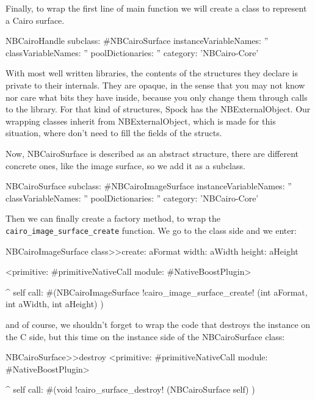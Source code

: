 \documentclass[a4paper,10pt,twoside]{book}
\begin{document}
Finally, to wrap the first line of main function we will create a
class to represent a Cairo surface.

\begin{classdef}{}
NBCairoHandle subclass: #NBCairoSurface
	instanceVariableNames: ''
	classVariableNames: ''
	poolDictionaries: ''
	category: 'NBCairo-Core'
\end{classdef}

With most well written libraries, the contents of the structures
they declare is private to their internals. They are opaque, in the
sense that you may not know nor care what bits they have inside,
because you only change them through calls to the library.
For that kind of structures, Spock has the NBExternalObject.
Our wrapping classes inherit from NBExternalObject, which is
made for this situation, where don't need to fill the fields
of the structs.

Now, NBCairoSurface is described as an abstract structure, 
there are different concrete ones, like the image surface,
so we add it as a subclass.


\begin{classdef}{}
NBCairoSurface subclass: #NBCairoImageSurface
	instanceVariableNames: ''
	classVariableNames: ''
	poolDictionaries: ''
	category: 'NBCairo-Core'
\end{classdef}

Then we can finally create a factory method, to wrap the \verb|cairo_image_surface_create| function. We go to the class side and
we enter:

\begin{code}{}
NBCairoImageSurface class>>create: aFormat width: aWidth height: aHeight

	<primitive: #primitiveNativeCall module: #NativeBoostPlugin>
	
	^ self call: #(NBCairoImageSurface !cairo\_image\_surface\_create! (int aFormat,
                                                         int aWidth,
                                                         int aHeight) )
\end{code}

and of course, we shouldn't forget to wrap the code that destroys the instance on the C side, but this time on the instance side of the NBCairoSurface class:

\begin{code}{}
NBCairoSurface>>destroy
	<primitive: #primitiveNativeCall module: #NativeBoostPlugin>
	
	^ self call: #(void !cairo\_surface\_destroy! (NBCairoSurface self) )

\end{code}
\end{document}
